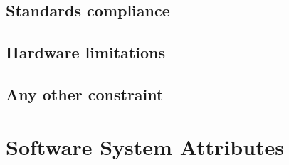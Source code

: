 \subsection{Standards compliance}

\subsection{Hardware limitations}

\subsection{Any other constraint}

%
\section{Software System Attributes}
%


